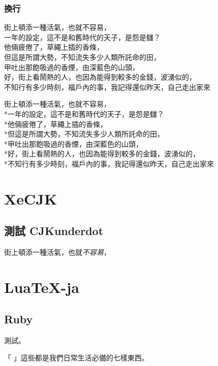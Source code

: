 \subsubsection{換行}
街上頓添一種活氣，也就不容易，\\一年的設定，這不是和舊時代的天子，是怨是讎？\\他倆疲倦了，草繩上插的香條，\\但這是所謂大勢，不知流失多少人類所託命的田，\\甲吐出那飽吸過的香煙，由深藍色的山頭，\\好，街上看鬧熱的人，也因為能得到較多的金錢，波湧似的，\\不知行有多少時刻，福戶內的事，我記得還似昨天，自己走出家來

街上頓添一種活氣，也就不容易，\\*一年的設定，這不是和舊時代的天子，是怨是讎？\\*他倆疲倦了，草繩上插的香條，\\*但這是所謂大勢，不知流失多少人類所託命的田，\\*甲吐出那飽吸過的香煙，由深藍色的山頭，\\*好，街上看鬧熱的人，也因為能得到較多的金錢，波湧似的，\\*不知行有多少時刻，福戶內的事，我記得還似昨天，自己走出家來

\ifXeTeX 
\section*{XeCJK}  %
\subsection*{測試 CJKunderdot}
街上頓添一種活氣，也就\emph{不容易}，
\fi

\ifLuaTeX
\section*{LuaTeX-ja}
\subsection*{Ruby}

測試。

「
」這些都是我們日常生活必備的七樣東西。
\fi
